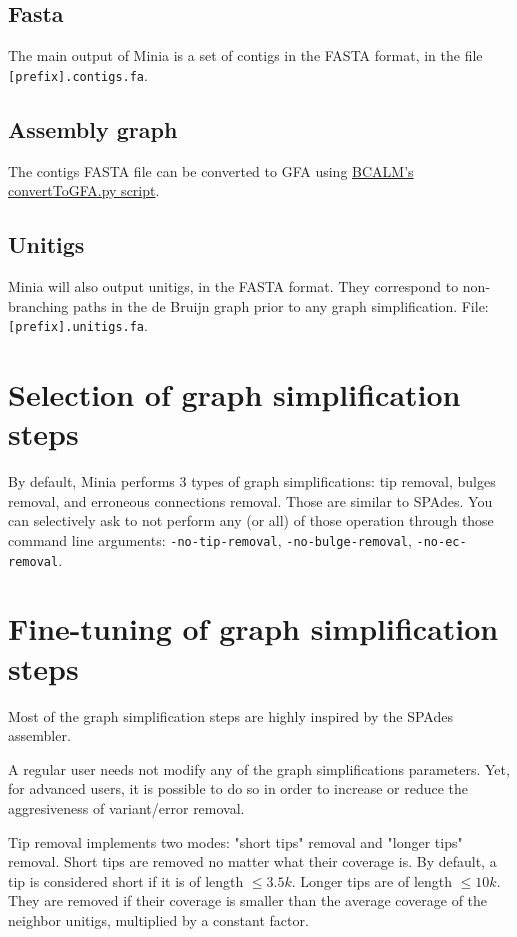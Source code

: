 \documentclass[a4paper]{article}
\begin{document}
\subsection{Fasta}

The main output of Minia is a set of contigs in the FASTA format, in the file \verb+[prefix].contigs.fa+. 

\subsection{Assembly graph}

The contigs FASTA file can be converted to GFA using \href{https://github.com/GATB/bcalm/blob/master/scripts/convertToGFA.py}{BCALM's convertToGFA.py script}.

\subsection*{Unitigs}

Minia will also output unitigs, in the FASTA format. They correspond to non-branching paths in the de Bruijn graph prior to any graph simplification. File: \verb+[prefix].unitigs.fa+. 

\section{Selection of graph simplification steps}

By default, Minia performs 3 types of graph simplifications: tip removal, bulges removal, and erroneous connections removal. Those are similar to SPAdes. You can selectively ask to not perform any (or all) of those operation through those command line arguments: \verb+-no-tip-removal+, \verb+-no-bulge-removal+, \verb+-no-ec-removal+.

\section{Fine-tuning of graph simplification steps}

Most of the graph simplification steps are highly inspired by the SPAdes assembler.

A regular user needs not modify any of the graph simplifications parameters.
Yet, for advanced users, it is possible to do so in order to increase or reduce the aggresiveness of variant/error removal.

Tip removal implements two modes: "short tips" removal and "longer tips" removal. Short tips are removed no matter what their coverage is. By default, a tip is considered short if it is of length $\leq 3.5k$. Longer tips are of length $\leq 10k$. They are removed if their coverage is smaller than the average coverage of the neighbor unitigs, multiplied by a constant factor.
\end{document}
